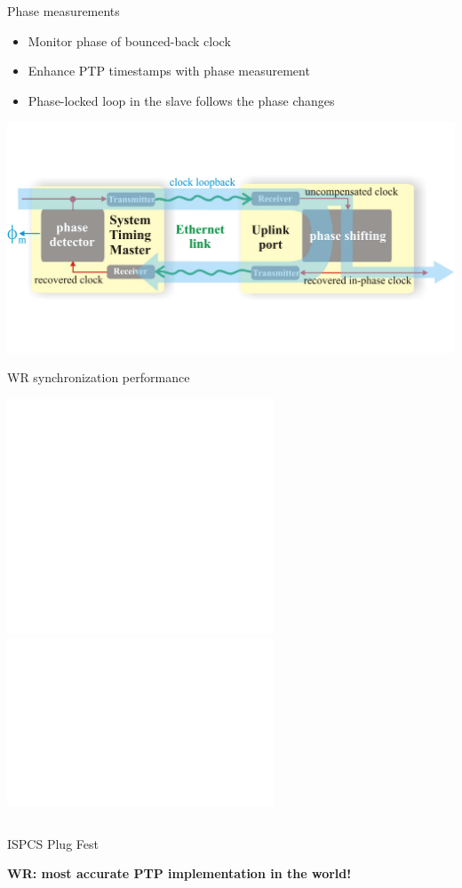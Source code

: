 \documentclass[compress,red]{beamer}
\begin{document}
\begin{frame}{Phase measurements}

  \begin{itemize}
    \item Monitor phase of bounced-back clock
    \item Enhance PTP timestamps with phase measurement
    \item Phase-locked loop in the slave follows the phase changes  
  \end{itemize}

  \begin{center}
    \includegraphics[width=1.0\textwidth]{misc/phase_tracking_v2_simple.pdf}
  \end{center}

\end{frame}

\begin{frame}{WR synchronization performance}

    \begin{center}
    \includegraphics<1>[height=7.0cm]{measurements/meas_setup.pdf}
    \includegraphics<2->[height=5.0cm]{measurements/meas_results.pdf}
     {
    \begin{columns}[c]
    \begin{block}{  \begin{center} ISPCS Plug Fest \end{center}}
      \begin{center}
	      \textbf{WR: most accurate PTP implementation in the world!}
      \end{center}
    \end{block}
    \end{columns}}
    \end{center}

\end{frame}
\end{document}

